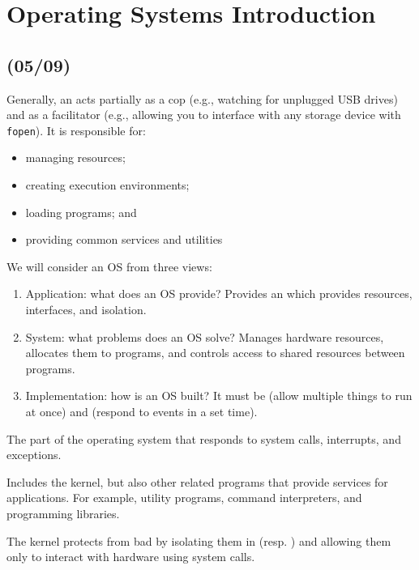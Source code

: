 \chapter{Operating Systems Introduction}

\section{(05/09)}

Generally, an  acts partially as a cop (e.g., watching for unplugged USB drives)
and as a facilitator (e.g., allowing you to interface with any storage device with \verb|fopen|).
It is responsible for:
\begin{itemize}[nosep]
  \item managing resources;
  \item creating execution environments;
  \item loading programs; and
  \item providing common services and utilities
\end{itemize}
We will consider an OS from three views:
\begin{enumerate}[1.,nosep]
  \item Application: what does an OS provide?
        Provides an 
        which provides resources, interfaces, and isolation.
  \item System: what problems does an OS solve?
        Manages hardware resources, allocates them to programs,
        and controls access to shared resources between programs.
  \item Implementation: how is an OS built?
        It must be  (allow multiple things to run at once)
        and  (respond to events in a set time).
\end{enumerate}

\begin{defn}[kernel]
  The part of the operating system that responds to system calls,
  interrupts, and exceptions.
\end{defn}
\begin{defn}
  Includes the kernel, but also other related programs that provide services
  for applications. For example, utility programs, command interpreters, and programming libraries.
\end{defn}

The kernel protects from bad  by isolating
them in  (resp. )
and allowing them only to interact with hardware using system calls.

